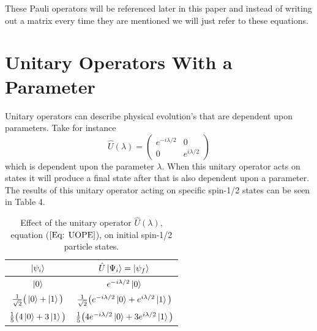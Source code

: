\documentclass[twocolumn]{article}
\begin{document}
These Pauli operators will be referenced later in this paper and instead of writing out a matrix every time they are mentioned we will just refer to these equations.
\section*{Unitary Operators With a Parameter}
Unitary operators can describe physical evolution's that are dependent upon parameters. Take for instance 
\begin{equation}\label{Eq: UOPE}
\hat{U}(\lambda)=
\begin{pmatrix}
e^{-i\lambda/2} & 0 \\
0 & e^{i\lambda/2}
\end{pmatrix}
\end{equation}
which is dependent upon the parameter $\lambda$. When this unitary operator acts on states it will produce a final state after that is also dependent upon a parameter. The results of this unitary operator acting on specific spin-1/2 states can be seen in Table 4.
\begin{table}[ht]
    \centering
    \begin{tabular}{|c|c|}
         \hline $\ket{\psi_i}$& $\hat{U}\ket{\Psi_i}=\ket{\psi_f}$ \\
         \hline $\ket{0}$& $e^{-i\lambda/2}\ket{0}$\\
         \hline $\frac{1}{\sqrt{2}}\big(\ket{0}+\ket{1}\big)$& $\frac{1}{\sqrt{2}}\big(e^{-i\lambda/2}\ket{0}+e^{i\lambda/2}\ket{1}\big)$\\
         \hline $\frac{1}{5}\big(4\ket{0}+3\ket{1}\big)$& $\frac{1}{5}\big(4e^{-i\lambda/2}\ket{0}+3e^{i\lambda/2}\ket{1}\big)$\\
         \hline
    \end{tabular}
    \caption{\footnotesize{Effect of the unitary operator $\hat{U}(\lambda)$, equation ($\ref{Eq: UOPE}$), on initial spin-1/2 particle states.}}
    \label{Tab: UOEOS12}
\end{table}
\par \noindent
\end{document}
